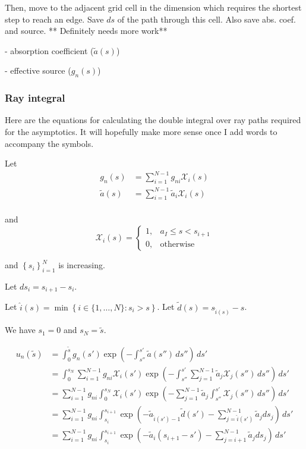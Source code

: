 Then, move to the adjacent grid cell in the dimension which requires the shortest
step to reach an edge. Save $ds$ of the path through this cell. Also save abs.
coef. and source.
** Definitely needs more work**

- absorption coefficient ($\tilde{a}(s)$)

- effective source ($g_n(s)$)

\subsubsection{Ray integral}

Here are the equations for calculating the double integral over ray paths
required for the asymptotics. It will hopefully make more sense once I add words
to accompany the symbols.

Let
\begin{align}
  g_n(s) &= \sum_{i=1}^{N-1}g_{ni}\mathcal{X}_i(s) \\
  \tilde{a}(s) &= \sum_{i=1}^{N-1}\tilde{a}_{i}\mathcal{X}_i(s) \\
\end{align}

and
\begin{equation}
  \mathcal{X}_i(s) = \begin{cases}
    1, & a_I \leq s < s_{i+1} \\
    0, & \mbox{otherwise}
    \end{cases}
\end{equation}

and $\left\{s_i\right\}_{i=1}^N$ is increasing.

Let $ds_i = s_{i+1} - s_i$.

Let $\hat{i}(s) = \min\left\{ i \in \{1,\ldots,N\} : s_i>s \right\}$.
Let $\tilde{d}(s) = s_{\hat{i}(s)}-s$.

We have $s_1 = 0$ and $s_N = \tilde{s}$.


\begin{align}
  u_n(\tilde{s}) &= \int_0^{\tilde{s}}g_n(s')\exp\left( -\int_{s''}^{s'}\tilde{a}(s'')\,ds'' \right)\, ds' \\
  &= \int_0^{s_N} \sum_{i=1}^{N-1}g_{ni}\mathcal{X}_i(s') \exp\left( -\int_{s''}^{s'}\sum_{j=1}^{N-1}\tilde{a}_{j}\mathcal{X}_j(s'')\,ds'' \right)\, ds' \\
  &= \sum_{i=1}^{N-1}g_{ni}\int_0^{s_N} \mathcal{X}_i(s') \exp\left( -\sum_{j=1}^{N-1}\tilde{a}_{j}\int_{s''}^{s'}\mathcal{X}_j(s'')\,ds'' \right)\, ds' \\
  &= \sum_{i=1}^{N-1}g_{ni}\int_{s_i}^{s_{i+1}}  \exp\left(-\tilde{a}_{\hat{i}(s')-1}\tilde{d}(s') -\sum_{j=\hat{i}(s')}^{N-1}\tilde{a}_{j}ds_j\right)\, ds' \\
  &= \sum_{i=1}^{N-1}g_{ni}\int_{s_i}^{s_{i+1}}  \exp\left(-\tilde{a}_{i}(s_{i+1}-s') -\sum_{j=i+1}^{N-1}\tilde{a}_{j}ds_j\right)\, ds'
\end{align}

